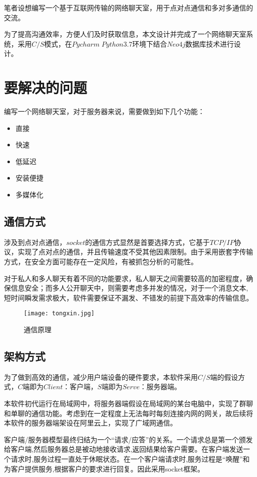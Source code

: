 \documentclass[forprint]{OSPaper}
\begin{document}
笔者设想编写一个基于互联网传输的网络聊天室，用于点对点通信和多对多通信的交流。

为了提高沟通效率，方便人们及时获取信息，本文设计并完成了一个网络聊天室系统，采用$  C/S  $模式，在$ Pycharm \; Python3.7 $环境下结合$ Neo4j $数据库技术进行设计。

\section{要解决的问题}

编写一个网络聊天室，对于服务器来说，需要做到如下几个功能：

\begin{itemize}
	\item 直接
	\item 快速
	\item 低延迟
	\item 安装便捷
	\item 多媒体化
\end{itemize}

\subsection{通信方式}
涉及到点对点通信，$socket$的通信方式显然是首要选择方式，它基于$TCP/IP$协议，实现了点对点的通信，并且传输速度不受其他因素限制。由于采用嵌套字传输方式，在安全方面可能存在一定风险，有被抓包分析的可能性。

对于私人和多人聊天有着不同的功能要求，私人聊天之间需要较高的加密程度，确保信息安全；而多人公开聊天中，则需要考虑多并发的情况，对于一个消息文本,短时间瞬发需求极大，软件需要保证不漏发、不错发的前提下高效率的传输信息。
\begin{figure}[ht]
	\centering
	\texttt{[image: tongxin.jpg]}
	\caption{通信原理}
	\label{fig:4}
	
\end{figure}

\subsection{架构方式}
为了做到高效的通信，减少用户端设备的硬件要求，本软件采用$ C/S $端的假设方式，$ C $端即为$ Client $：客户端，$ S $端即为$ Serve $：服务器端。

本软件初代运行在局域网中，将服务器端假设在局域网的某台电脑中，实现了群聊和单聊的通信功能。考虑到在一定程度上无法每时每刻连接内网的网关，故后续将本软件的服务器端架设在阿里云上，实现了广域网通信。


客户端/服务器模型最终归结为一个“请求/应答”的关系。一个请求总是第一个颁发给客户端,然后服务器总是被动地接收请求,返回结果给客户需要。在客户端发送一个请求时,服务过程一直处于休眠状态。在一个客户端请求时,服务过程是“唤醒”和为客户提供服务,根据客户的要求进行回复。因此采用socket框架。
\end{document}
